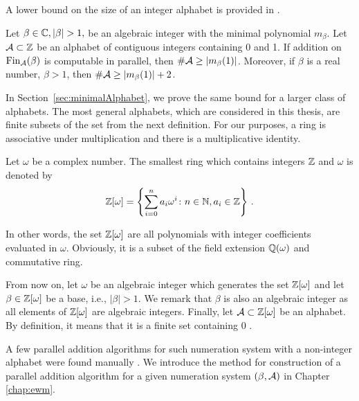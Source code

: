 A lower bound on the size of an integer alphabet is provided in \cite{minAlph}. 
  \begin{thm}
  \label{thm:lowerBoundIntegerAlphabet}
Let $\beta\in\CC, |\beta|>1,$  be an algebraic integer with the minimal polynomial $m_\beta$. Let $\mathcal{A}\subset\mathbb{Z}$ be an alphabet of contiguous integers containing 0 and 1. If addition on $\text{Fin}_{\mathcal{A}}(\beta)$ is computable in parallel, then $\#\mathcal{A} \geq |m_\beta(1)|$. Moreover, if $\beta$ is a real number, $\beta>1$, then $\#\mathcal{A} \geq  |m_\beta(1)|+2$.
  \end{thm}
  
In Section~\ref{sec:minimalAlphabet}, we prove the same bound for a larger class of alphabets. The most general alphabets, which are considered in this thesis, are finite subsets of the set from the next definition. For our purposes, a ring is associative under multiplication and there is a multiplicative identity.
\begin{defn}
Let $\omega$ be a complex number. The smallest ring which contains integers $\mathbb{Z}$ and $\omega$ is denoted by
$$
    \mathbb{Z}[\omega] =\left\{\sum_{i=0}^n a_i \omega^i\colon n\in\mathbb{N}, a_i\in\mathbb{Z} \right\} \,.
$$
\end{defn}
In other words, the set $\mathbb{Z}[\omega]$ are all polynomials with integer coefficients evaluated in $\omega$. Obviously, it is a subset of the field extension $\mathbb{Q}(\omega)$ and commutative ring.
    
From now on, let $\omega$ be an algebraic integer  which generates the set $\mathbb{Z}[\omega]$ and let $\beta\in\mathbb{Z}[\omega]$ be a base, i.e., $|\beta|>1$. We remark that $\beta$ is also an algebraic integer as all elements of $\mathbb{Z}[\omega]$ are algebraic integers. Finally, let $\mathcal{A}\subset\mathbb{Z}[\omega]$ be an alphabet. By definition, it means that it is a finite set containing 0 .

A few parallel addition algorithms for such numeration system with a non-integer alphabet were found manually \cite{milena}. We introduce the method for construction of a parallel addition algorithm for a given numeration system $(\beta,\mathcal{A})$ in Chapter \ref{chap:ewm}. 
